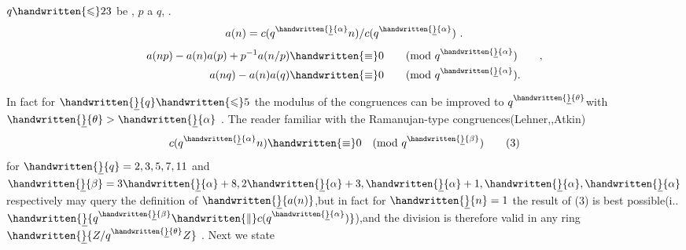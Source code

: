  $q\handwritten{\leqslant}23$ be , $p$  a  $q$, . 
\[
a(n)=c(q^{\handwritten{\underline}{\alpha}}n)/c(q^{\handwritten{\underline}{\alpha}})\ .
\]
\[
\begin{aligned}
a(np)-a(n)a(p)+p^{-1}a(n/p)&\handwritten{\equiv}0 \qquad (\mathrm{mod}\ q^{\handwritten{\underline}{\alpha}})\qquad ,\\
a(nq)-a(n)a(q)&\handwritten{\equiv}0 \qquad (\mathrm{mod}\ q^{\handwritten{\underline}{\alpha}}).
\end{aligned}
\]
\margin{\handwritten{\#}}

In fact for $\handwritten{\underline}{q}\handwritten{\leqslant}5$ the modulus of the congruences can be improved to $q^{\handwritten{\underline}{\theta}}$\reversemarginpar{}\normalmarginpar with $\handwritten{\underline}{\theta}>\handwritten{\underline}{\alpha}$ . The reader familiar with the Ramanujan-type congruences(Lehner,,Atkin)
\[
c(q^{\handwritten{\underline}{\alpha}}n)\handwritten{\equiv}0\quad(\mathrm{mod}\ q^{\handwritten{\underline}{\beta}})
\tag*{(3)}
\]
for $\handwritten{\underline}{q}=2,3,5,7,11$ and $\handwritten{\underline}{\beta}=3\handwritten{\underline}{\alpha}+8,2\handwritten{\underline}{\alpha}+3,\handwritten{\underline}{\alpha}+1,\handwritten{\underline}{\alpha},\handwritten{\underline}{\alpha}$\reversemarginpar{}\normalmarginpar respectively may query the definition of $\handwritten{\underline}{a(n)}$,but in fact for $\handwritten{\underline}{n}=1$ the result of (3) is best possible(i.. $\handwritten{\underline}{q^{\handwritten{\underline}{\beta}}\handwritten{\parallel}c(q^{\handwritten{\underline}{\alpha}})}$),and the division is therefore valid in any ring $\handwritten{\underline}{Z/q^{\handwritten{\underline}{\theta}}Z}$ . Next we state

